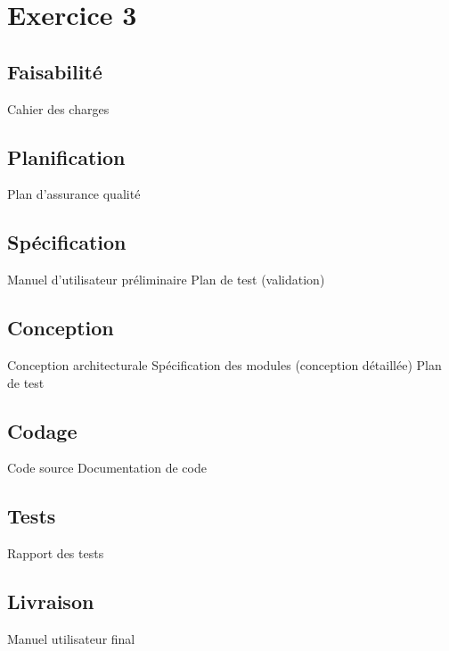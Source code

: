 \section{Exercice 3}

\subsection{Faisabilité}

Cahier des charges

\subsection{Planification}

Plan d'assurance qualité

\subsection{Spécification}

Manuel d'utilisateur préliminaire
Plan de test (validation)

\subsection{Conception}

Conception architecturale
Spécification des modules (conception détaillée)
Plan de test

\subsection{Codage}

Code source
Documentation de code

\subsection{Tests}

Rapport des tests

\subsection{Livraison}

Manuel utilisateur final


